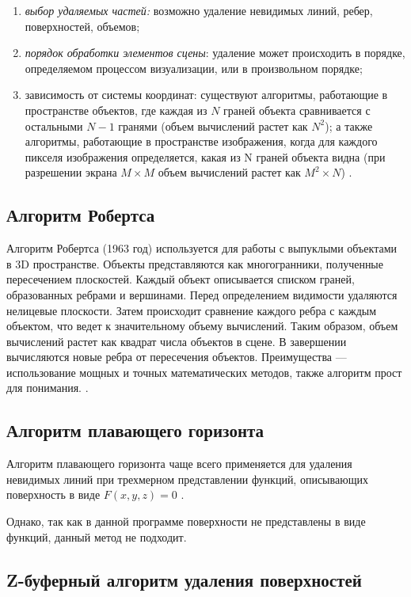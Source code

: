 \begin{enumerate}
	\item \textit{выбор удаляемых частей:} возможно удаление невидимых линий, ребер, поверхностей, объемов;
	\item \textit{порядок обработки элементов сцены}: удаление может происходить в порядке, определяемом процессом визуализации, или в произвольном порядке;
	\item зависимость от системы координат: существуют алгоритмы, работающие в пространстве объектов, где каждая из $N$ граней объекта сравнивается с остальными $N - 1$ гранями (объем вычислений растет как $N^2$); а также алгоритмы, работающие в пространстве изображения, когда для каждого пикселя изображения определяется, какая из N граней объекта видна (при разрешении экрана $M\times{M}$ объем вычислений растет как $M^2 \times N$) \cite{del_line}.
\end{enumerate}

\subsection{Алгоритм Робертса}

Алгоритм Робертса (1963 год) используется для работы с выпуклыми объектами в 3D пространстве. Объекты представляются как многогранники, полученные пересечением плоскостей. Каждый объект описывается списком граней, образованных ребрами и вершинами. Перед определением видимости удаляются нелицевые плоскости. Затем происходит сравнение каждого ребра с каждым объектом, что ведет к значительному объему вычислений. Таким образом, объем вычислений растет как квадрат числа объектов в сцене. В завершении вычисляются новые ребра от пересечения объектов. Преимущества ---  использование мощных и точных математических методов, также алгоритм прост для понимания. \cite{del_line}. 

\subsection{Алгоритм плавающего горизонта}

Алгоритм плавающего горизонта чаще всего применяется для удаления невидимых линий при трехмерном представлении функций, описывающих поверхность в виде $F(x, y, z) = 0$ \cite{del_line}.

Однако, так как в данной программе поверхности не представлены в виде функций, данный метод не подходит.

\subsection{Z-буферный алгоритм удаления поверхностей}

